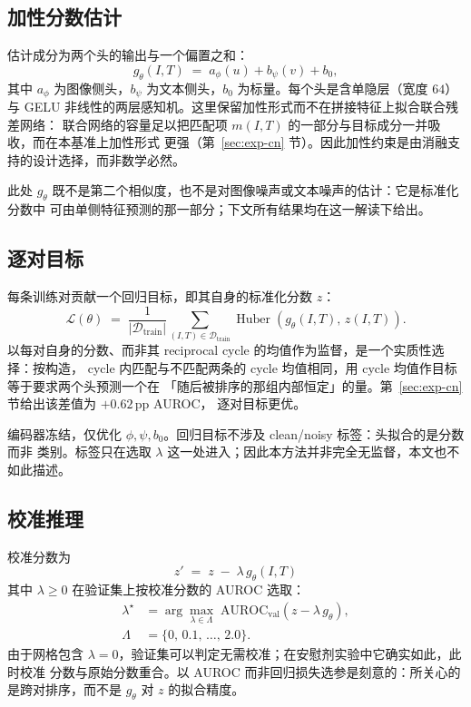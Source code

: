 \documentclass[10pt,twocolumn,a4paper]{ctexart}
\begin{document}
\subsection{加性分数估计}
估计成分为两个头的输出与一个偏置之和：
\begin{equation}
  g_\theta(I,T) \;=\; a_\phi(u) + b_\psi(v) + b_0,
  \label{eq:g-cn}
\end{equation}
其中 $a_\phi$ 为图像侧头，$b_\psi$ 为文本侧头，$b_0$ 为标量。每个头是含单隐层（宽度
$64$）与 GELU 非线性的两层感知机。这里保留加性形式而不在拼接特征上拟合联合残差网络：
联合网络的容量足以把匹配项 $m(I,T)$ 的一部分与目标成分一并吸收，而在本基准上加性形式
更强（第~\ref{sec:exp-cn} 节）。因此加性约束是由消融支持的设计选择，而非数学必然。

此处 $g_\theta$ 既不是第二个相似度，也不是对图像噪声或文本噪声的估计：它是标准化分数中
可由单侧特征预测的那一部分；下文所有结果均在这一解读下给出。

\subsection{逐对目标}
每条训练对贡献一个回归目标，即其自身的标准化分数 $z$：
\begin{equation}
  \mathcal{L}(\theta) \;=\; \frac{1}{|\mathcal{D}_{\text{train}}|}
  \sum_{(I,T)\in\mathcal{D}_{\text{train}}}
  \operatorname{Huber}\!\left(g_\theta(I,T),\, z(I,T)\right).
  \label{eq:loss-cn}
\end{equation}
以每对自身的分数、而非其 reciprocal cycle 的均值作为监督，是一个实质性选择：按构造，
cycle 内匹配与不匹配两条的 cycle 均值相同，用 cycle 均值作目标等于要求两个头预测一个在
「随后被排序的那组内部恒定」的量。第~\ref{sec:exp-cn} 节给出该差值为 $+0.62$\,pp AUROC，
逐对目标更优。

编码器冻结，仅优化 $\phi,\psi,b_0$。回归目标不涉及 clean/noisy 标签：头拟合的是分数而非
类别。标签只在选取 $\lambda$ 这一处进入；因此本方法并非完全无监督，本文也不如此描述。

\subsection{校准推理}
校准分数为
\begin{equation}
  \boxed{\,z' \;=\; z \;-\; \lambda\, g_\theta(I,T)\,}
  \label{eq:calib-cn}
\end{equation}
其中 $\lambda\ge 0$ 在验证集上按校准分数的 AUROC 选取：
\begin{equation}
\begin{aligned}
  \lambda^{\star} &= \arg\max_{\lambda\in\Lambda}\;
  \mathrm{AUROC}_{\text{val}}\!\left(z-\lambda\,g_\theta\right),\\
  \Lambda &= \{0,\,0.1,\,\dots,\,2.0\}.
\end{aligned}
\label{eq:lambda-cn}
\end{equation}
由于网格包含 $\lambda=0$，验证集可以判定无需校准；在安慰剂实验中它确实如此，此时校准
分数与原始分数重合。以 AUROC 而非回归损失选参是刻意的：所关心的是跨对排序，而不是
$g_\theta$ 对 $z$ 的拟合精度。
\end{document}

